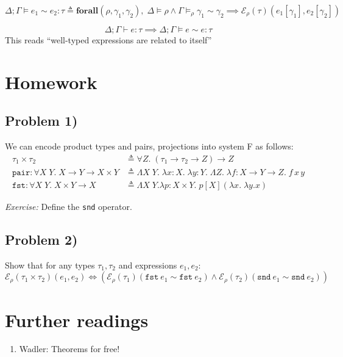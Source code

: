 \documentclass{notes}
\newcommand{\E}{\mathcal{E}}
\begin{document}
\begin{defn}
  \[\Delta;\Gamma\vDash e_1\sim e_2:\tau \triangleq \textbf{forall}(\rho,\gamma_1,\gamma_2),\;\Delta\vDash \rho\land \Gamma\vDash_\rho \gamma_1\sim\gamma_2\implies \E_\rho(\tau)(e_1[\gamma_1], e_2[\gamma_2])\]
\end{defn}

\begin{thm}[Parametricity]
  \[\Delta;\Gamma\vdash e:\tau \implies \Delta;\Gamma\vDash e \sim e:\tau\]
  This reads ``well-typed expressions are related to itself''
\end{thm}

\section{Homework}
\subsection{Problem 1)}
We can encode product types and pairs, projections into system F as follows:
\begin{align*}
  \tau_1\times \tau_2 &\triangleq \forall Z.\;(\tau_1\to\tau_2\to Z)\to Z\\
  \texttt{pair} :\forall X\;Y.\;X\to Y\to X\times Y &\triangleq \Lambda X\;Y.\;\lambda x:X.\;\lambda y:Y.\;\Lambda Z.\;\lambda f:X\to Y\to Z.\;f\,x\,y\\
  \texttt{fst}: \forall X\;Y.\;X\times Y\to X &\triangleq \Lambda X\;Y.\lambda p:X\times Y.\;p[X](\lambda x.\;\lambda y.x)
\end{align*}

\textit{Exercise:} Define the \texttt{snd} operator.

\subsection{Problem 2)}
Show that for any types $\tau_1,\tau_2$ and expressions $e_1,e_2$:
\[\E_\rho(\tau_1\times \tau_2)(e_1,e_2) \iff (\E_\rho(\tau_1)(\texttt{fst}~e_1\sim \texttt{fst}~e_2)\land \E_\rho(\tau_2)(\texttt{snd}~e_1\sim \texttt{snd}~e_2))\]

\section{Further readings}
\begin{enumerate}
  \item {Wadler: Theorems for free!}
\end{enumerate}
\end{document}
